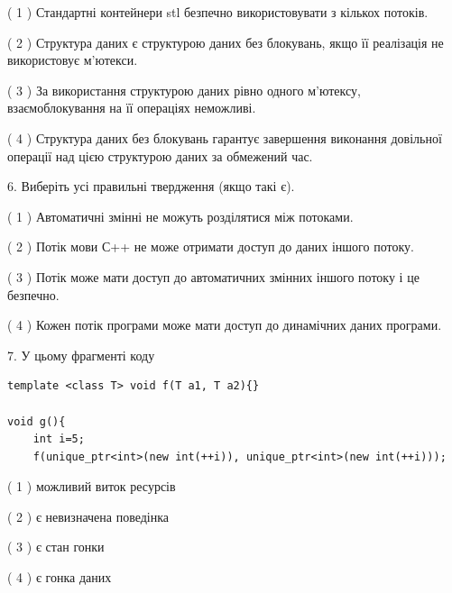\documentclass[12pt, ukrainian]{article}
\begin{document}
\begin {large}
{( 1 ) Стандартні контейнери stl безпечно використовувати з кількох потоків.%

( 2 ) Структура даних є структурою даних без блокувань, якщо її реалізація не використовує м’ютекси.%

( 3 ) За використання структурою даних рівно одного м’ютексу, взаємоблокування на її операціях неможливі.%

( 4 ) Структура даних без блокувань гарантує завершення виконання довільної операції над цією структурою даних за обмежений час.%
\newpage



\vspace{5mm}
6. Виберіть усі правильні твердження (якщо такі є).\par
\vspace{2mm}

( 1 ) Автоматичні змінні не можуть розділятися між потоками.%

( 2 ) Потік мови С++ не може отримати доступ до даних іншого потоку.%

( 3 ) Потік може мати доступ до автоматичних змінних іншого потоку і це безпечно.%

( 4 ) Кожен потік програми може мати доступ до динамічних даних програми.%


\vspace{5mm}
7. У цьому фрагменті коду
\begin{verbatim}
template <class T> void f(T a1, T a2){}

void g(){
    int i=5;
    f(unique_ptr<int>(new int(++i)), unique_ptr<int>(new int(++i)));
\end{verbatim}

( 1 ) можливий виток ресурсів%

( 2 ) є невизначена поведінка%

( 3 ) є стан гонки%

( 4 ) є гонка даних%
}
\end {large}
\end{document}
